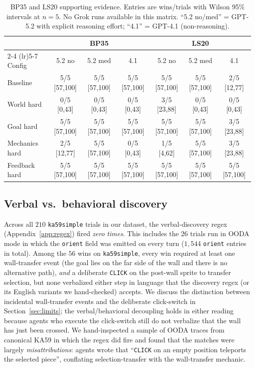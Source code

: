 \documentclass{article}
\begin{document}
\begin{table}[t]
  \small
  \setlength{\tabcolsep}{4pt}
  \caption{BP35 and LS20 supporting evidence. Entries are wins/trials with Wilson 95\% intervals at $n=5$. No Grok runs available in this matrix. ``5.2 no/med'' = GPT-5.2 with explicit reasoning effort; ``4.1'' = GPT-4.1 (non-reasoning).}
  \label{tab:bp35-ls20}
  \centering
  \begin{tabular}{lcccccc}
    \toprule
    & \multicolumn{3}{c}{BP35} & \multicolumn{3}{c}{LS20} \\
    \cmidrule(lr){2-4} \cmidrule(lr){5-7}
    Config & 5.2 no & 5.2 med & 4.1 & 5.2 no & 5.2 med & 4.1 \\
    \midrule
    Baseline       & 5/5 [57,100] & 5/5 [57,100] & 5/5 [57,100] & 5/5 [57,100] & 5/5 [57,100] & 2/5 [12,77] \\
    World hard     & 0/5 [0,43]   & 0/5 [0,43]   & 0/5 [0,43]   & 3/5 [23,88]  & 0/5 [0,43]   & 0/5 [0,43] \\
    Goal hard      & 5/5 [57,100] & 5/5 [57,100] & 5/5 [57,100] & 5/5 [57,100] & 5/5 [57,100] & 3/5 [23,88] \\
    Mechanics hard & 2/5 [12,77]  & 5/5 [57,100] & 0/5 [0,43]   & 1/5 [4,62]   & 5/5 [57,100] & 3/5 [23,88] \\
    Feedback hard  & 5/5 [57,100] & 5/5 [57,100] & 5/5 [57,100] & 5/5 [57,100] & 5/5 [57,100] & 5/5 [57,100] \\
    \bottomrule
  \end{tabular}
\end{table}

\subsection{Verbal vs.\ behavioral discovery}
\label{sec:verbal-behavioral}
Across all $210$ \texttt{ka59simple} trials in our dataset, the verbal-discovery regex (Appendix~\ref{app:regex}) fired \emph{zero times}. This includes the $26$ trials run in OODA mode in which the \texttt{orient} field was emitted on every turn ($1{,}544$ \texttt{orient} entries in total). Among the $56$ wins on \texttt{ka59simple}, every win required at least one wall-transfer event (the goal lies on the far side of the wall and there is no alternative path), \emph{and} a deliberate \texttt{CLICK} on the post-wall sprite to transfer selection, but none verbalized either step in language that the discovery regex (or its English variants we hand-checked) accepts. We discuss the distinction between incidental wall-transfer events and the deliberate click-switch in Section~\ref{sec:limits}; the verbal/behavioral decoupling holds in either reading because agents who execute the click-switch still do not verbalize that the wall has just been crossed. We hand-inspected a sample of OODA traces from canonical KA59 in which the regex did fire and found that the matches were largely \emph{misattributions}: agents wrote that ``\texttt{CLICK} on an empty position teleports the selected piece'', conflating selection-transfer with the wall-transfer mechanic.
\end{document}
